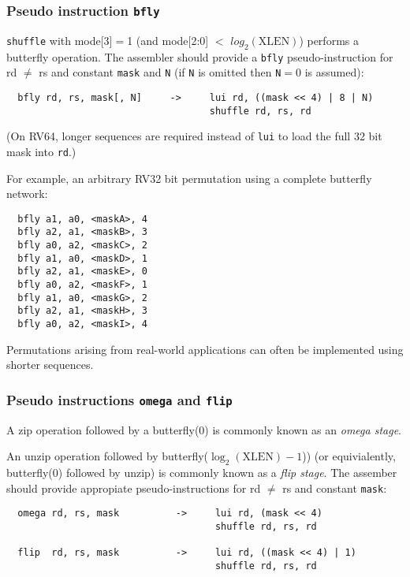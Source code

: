 \subsubsection{Pseudo instruction {\tt bfly}}

{\tt shuffle} with mode[3]$=$1 (and mode[2:0] $<$ $log_2(\textrm{XLEN})$) performs
a butterfly operation. The assembler should provide a {\tt bfly} pseudo-instruction
for rd $\neq$ rs and constant {\tt mask} and {\tt N} (if {\tt N} is omitted then
{\tt N}$=$0 is assumed):

\begin{verbatim}
  bfly rd, rs, mask[, N]     ->     lui rd, ((mask << 4) | 8 | N)
                                    shuffle rd, rs, rd
\end{verbatim}

(On RV64, longer sequences are required instead of {\tt lui} to load the full
32 bit mask into {\tt rd}.)

For example, an arbitrary RV32 bit permutation using a complete butterfly network:

\begin{verbatim}
  bfly a1, a0, <maskA>, 4
  bfly a2, a1, <maskB>, 3
  bfly a0, a2, <maskC>, 2
  bfly a1, a0, <maskD>, 1
  bfly a2, a1, <maskE>, 0
  bfly a0, a2, <maskF>, 1
  bfly a1, a0, <maskG>, 2
  bfly a2, a1, <maskH>, 3
  bfly a0, a2, <maskI>, 4
\end{verbatim}

Permutations arising from real-world applications can often be implemented using
shorter sequences.

\subsubsection{Pseudo instructions {\tt omega} and {\tt flip}}

A zip operation followed by a butterfly(0) is commonly known as an {\it omega stage}.

An unzip operation followed by butterfly($\log_2(\textrm{XLEN})-1$)) (or
equivialently, butterfly(0) followed by unzip) is commonly known as a {\it flip
stage}. The assember should provide appropiate pseudo-instructions for rd
$\neq$ rs and constant {\tt mask}:

\begin{verbatim}
  omega rd, rs, mask          ->     lui rd, (mask << 4)
                                     shuffle rd, rs, rd

  flip  rd, rs, mask          ->     lui rd, ((mask << 4) | 1)
                                     shuffle rd, rs, rd
\end{verbatim}

